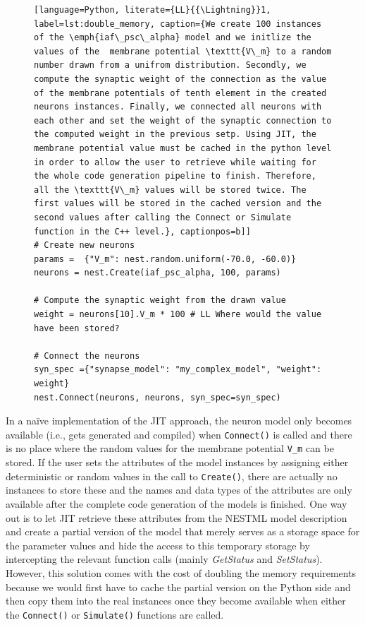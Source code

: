 \begin{figure}[ht!]
  \centering
\begin{lstlisting}[language=Python, literate={LL}{{\Lightning}}1, label=lst:double_memory, caption={We create 100 instances of the \emph{iaf\_psc\_alpha} model and we initlize the values of the  membrane potential \texttt{V\_m} to a random number drawn from a unifrom distribution. Secondly, we compute the synaptic weight of the connection as the value of the membrane potentials of tenth element in the created neurons instances. Finally, we connected all neurons with each other and set the weight of the synaptic connection to the computed weight in the previous setp. Using JIT, the membrane potential value must be cached in the python level in order to allow the user to retrieve while waiting for the whole code generation pipeline to finish. Therefore, all the \texttt{V\_m} values will be stored twice. The first values will be stored in the cached version and the second values after calling the Connect or Simulate function in the C++ level.}, captionpos=b]]
# Create new neurons
params =  {"V_m": nest.random.uniform(-70.0, -60.0)}
neurons = nest.Create(iaf_psc_alpha, 100, params)

# Compute the synaptic weight from the drawn value
weight = neurons[10].V_m * 100 # LL Where would the value have been stored?

# Connect the neurons
syn_spec ={"synapse_model": "my_complex_model", "weight": weight}
nest.Connect(neurons, neurons, syn_spec=syn_spec)
\end{lstlisting}
\end{figure}


In a na\"ive implementation of the JIT approach, the neuron model only becomes available (i.e., gets generated and compiled) when \texttt{Connect()} is called and there is no place where the random values for the membrane potential \texttt{V\_m} can be stored. If the user sets the attributes of the model instances by assigning either deterministic or random values in the call to \texttt{Create()}, there are actually no instances to store these and the names and data types of the attributes are only available after the complete code generation of the models is finished. One way out is to let JIT retrieve these attributes from the NESTML model description and create a partial version of the model that merely serves as a storage space for the parameter values and hide the access to this temporary storage by intercepting the relevant function calls (mainly \emph{GetStatus} and \emph{SetStatus}). However, this solution comes with the cost of doubling the memory requirements because we would first have to cache the partial version on the Python side and then copy them into the real instances once they become available when either the \texttt{Connect()} or \texttt{Simulate()} functions are called.

